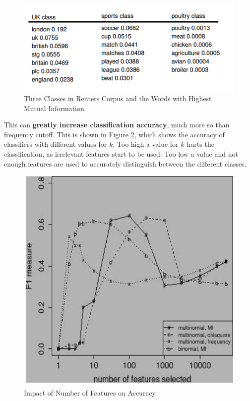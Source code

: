 \documentclass{article}
\begin{document}
\begin{figure}[H]
	\centering
	\includegraphics[scale=0.7]{figures/mutual-information-cutoff.png}
	\caption{Three Classes in Reuters Corpus and the Words with Highest Mutual Information}
	\label{fig:example-mu}
\end{figure}

This can \textbf{greatly increase classification accuracy}, much more so than frequency cutoff. This is shown in Figure \ref{fig:mu-acc-impact}, which shows the accuracy of classifiers with different values for $k$. Too high a value for $k$ hurts the classification, as irrelevant features start to be used. Too low a value and not enough features are used to accurately distinguish between the different classes.

\begin{figure}[H]
	\centering
	\includegraphics[scale=0.4]{figures/feature-amount-performance.png}
	\caption{Impact of Number of Features on Accuracy}
	\label{fig:mu-acc-impact}
\end{figure}
\end{document}
